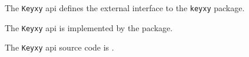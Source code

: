 
The {\tt Keyxy} api defines the external interface to the {\tt keyxy} package.

The {\tt Keyxy} api is implemented by the  package.

The {\tt Keyxy} api source code is .
